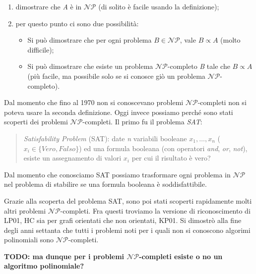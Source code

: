 \documentclass[11pt]{book}
\begin{document}
\begin{enumerate}
\item dimostrare che {\em A} \`e in $\mathcal{NP}$ (di solito \`e
  facile usando la definizione);
\item per questo punto ci sono due possibilit\`a:
  
  \begin{itemize}
  \item Si pu\`o dimostrare che per ogni problema $B \in
    \mathcal{NP}$, vale $B \propto A$ (molto difficile);
  \item Si pu\`o dimostrare che esiste un problema
    $\mathcal{NP}$-completo {\em B} tale che $B \propto A$ (pi\`u
    facile, ma possibile solo se si conosce gi\`o un problema
    $\mathcal{NP}$-completo).
  \end{itemize}

\end{enumerate}

Dal momento che fino al 1970 non si conoscevano problemi
$\mathcal{NP}$-completi non si poteva usare la seconda
definizione. Oggi invece possiamo perch\'e sono stati scoperti dei
problemi $\mathcal{NP}$-completi. Il primo fu il problema {\em SAT}:

\begin{quote}
{\em Satisfability Problem} (SAT): date {\em n} variabili booleane
$x_1,\dots,x_n$ ($x_i \in \{Vero,Falso\}$) ed una formula booleana
(con operatori {\em and}, {\em or}, {\em not}), esiste un assegnamento
di valori $x_i$ per cui il risultato \`e vero?
\end{quote}

Dal momento che conosciamo SAT possiamo trasformare ogni problema in
$\mathcal{NP}$ nel problema di stabilire se una formula booleana \`e
soddisfattibile.

Grazie alla scoperta del problema SAT, sono poi stati scoperti
rapidamente molti altri problemi $\mathcal{NP}$-completi. Fra questi
troviamo la versione di riconoscimento di LP01, HC sia per grafi
orientati che non orientati, KP01. Si dimostr\`o alla fine degli anni
settanta che tutti i problemi noti per i quali non si conoscono
algorimi polinomiali sono $\mathcal{NP}$-completi.

{\bf TODO: ma dunque per i problemi $\mathcal{NP}$-completi esiste o
  no un algoritmo polinomiale?}
\end{document}
